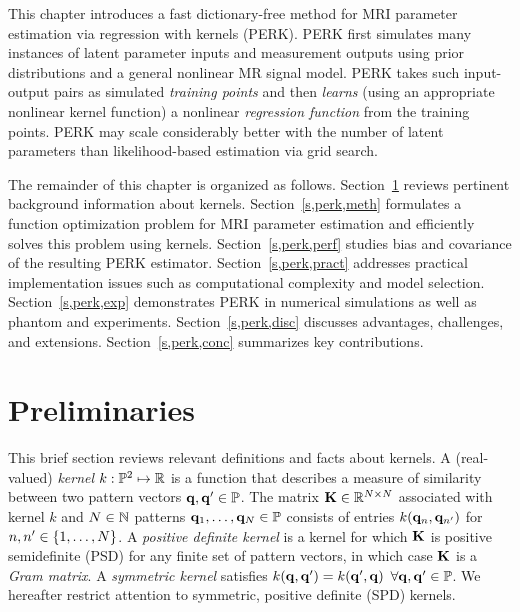 This chapter introduces  
a fast dictionary-free method
for MRI parameter estimation
via regression with kernels (PERK).
PERK first simulates many instances
of latent parameter inputs
and measurement outputs
using prior distributions
and a general nonlinear MR signal model.
PERK takes such input-output pairs
as simulated \emph{training points}
and then \emph{learns}
(using an appropriate nonlinear kernel function)
a nonlinear \emph{regression function}
from the training points.
PERK may scale considerably better
with the number of latent parameters
than likelihood-based estimation 
via grid search.

The remainder of this chapter
is organized as follows.
Section~\ref{s,perk,rev} reviews 
pertinent background information about kernels. 
Section~\ref{s,perk,meth} formulates 
a function optimization problem
for MRI parameter estimation
and efficiently solves this problem 
using kernels.
Section~\ref{s,perk,perf} studies bias and covariance
of the resulting PERK estimator.
Section~\ref{s,perk,pract} addresses practical implementation issues
such as computational complexity and model selection.
Section~\ref{s,perk,exp} demonstrates PERK
in numerical simulations
as well as phantom and \invivo experiments.
Section~\ref{s,perk,disc} discusses advantages,
challenges, and extensions.
Section~\ref{s,perk,conc} summarizes key contributions.

\section{Preliminaries}
\label{s,perk,rev}

This brief section reviews
relevant definitions and facts about kernels.
A (real-valued) \emph{kernel} 
$k : \mathbb{P}^2 \mapsto \mathbb{R}$
is a function 
that describes a measure of similarity
between two pattern vectors 
$\mathbf{q},\mathbf{q}' \in \mathbb{P}$.
The matrix $\mathbf{K} \in \mathbb{R}^{N \times N}$
associated with kernel $k$
and $N \in \mathbb{N}$ patterns $\mathbf{q}_1,\dots,\mathbf{q}_N \in \mathbb{P}$
consists of entries
$k\paren{\bmq_n,\bmq_{n'}}$
for $n,n' \in \set{1,\dots,N}$.
A \emph{positive definite kernel} is a kernel
for which $\mathbf{K}$ is positive semidefinite (PSD)
for any finite set of pattern vectors,
in which case $\mathbf{K}$
is a \emph{Gram matrix}.
A \emph{symmetric kernel} satisfies 
$k\paren{\bmq,\bmq'} = k\paren{\bmq',\bmq}$
$\forall \mathbf{q},\mathbf{q}' \in \mathbb{P}$.
We hereafter restrict attention
to symmetric, positive definite (SPD) kernels.

